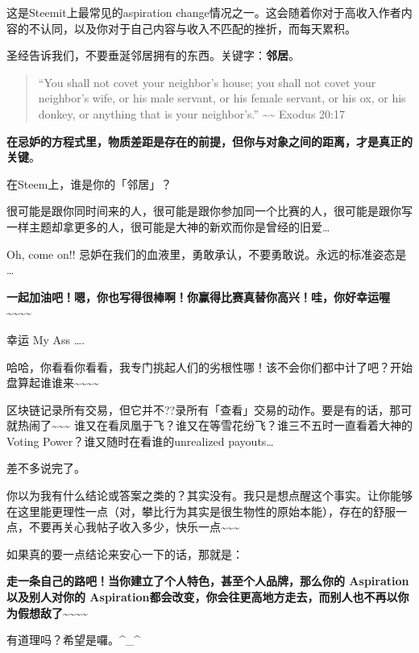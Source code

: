 \documentclass[]{ctexbook}
\begin{document}
这是Steemit上最常见的aspiration change情况之一。这会随着你对于高收入作者内容的不认同，以及你对于自己内容与收入不匹配的挫折，而每天累积。

圣经告诉我们，不要垂涎邻居拥有的东西。关键字：\textbf{邻居}。

\begin{quote}
``You shall not covet your neighbor's house; you shall not covet your neighbor's wife, or his male servant, or his female servant, or his ox, or his donkey, or anything that is your neighbor's.'' \textasciitilde{}\textasciitilde{} Exodus 20:17
\end{quote}

\textbf{在忌妒的方程式里，物质差距是存在的前提，但你与对象之间的距离，才是真正的关键}。

在Steem上，谁是你的「邻居」？

很可能是跟你同时间来的人，很可能是跟你参加同一个比赛的人，很可能是跟你写一样主题却拿更多的人，很可能是大神的新欢而你是曾经的旧爱\ldots{}

Oh, come on!! 忌妒在我们的血液里，勇敢承认，不要勇敢说。永远的标准姿态是 \ldots{}

\textbf{一起加油吧！嗯，你也写得很棒啊！你赢得比赛真替你高兴！哇，你好幸运喔\textasciitilde{}\textasciitilde{}\textasciitilde{}\textasciitilde{}}

幸运 My Ass \ldots{}.

哈哈，你看看你看看，我专门挑起人们的劣根性哪！该不会你们都中计了吧？开始盘算起谁谁来\textasciitilde{}\textasciitilde{}\textasciitilde{}\textasciitilde{}

区块链记录所有交易，但它并不??录所有「查看」交易的动作。要是有的话，那可就热闹了\textasciitilde{}\textasciitilde{}\textasciitilde{} 谁又在看凤凰于飞？谁又在等雪花纷飞？谁三不五时一直看着大神的Voting Power？谁又随时在看谁的unrealized payouts\ldots{}

差不多说完了。

你以为我有什么结论或答案之类的？其实没有。我只是想点醒这个事实。让你能够在这里能更理性一点（对，攀比行为其实是很生物性的原始本能），存在的舒服一点，不要再关心我帖子收入多少，快乐一点\textasciitilde{}\textasciitilde{}\textasciitilde{}

如果真的要一点结论来安心一下的话，那就是：

\textbf{走一条自己的路吧！当你建立了个人特色，甚至个人品牌，那么你的 Aspiration以及别人对你的 Aspiration都会改变，你会往更高地方走去，而别人也不再以你为假想敌了\textasciitilde{}\textasciitilde{}\textasciitilde{}\textasciitilde{}}

有道理吗？希望是囉。\^{}\_\^{}
\end{document}
